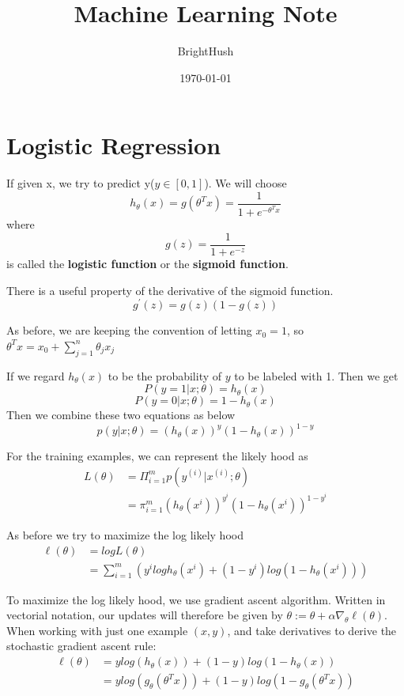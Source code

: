 \documentclass[UTF8]{ctexart}
\title{Machine Learning Note}
\author{BrightHush}
\date{\today}
\begin{document}
\maketitle
\tableofcontents

\pagestyle{fancy}
\cfoot{\thepage}

\newcommand{\figref}[1]{\figurename~\ref{#1}}

\section{Logistic Regression}
If given x, we try to predict y($y \in [0, 1]$). We will choose
\[ h_{\theta}(x) = g(\theta ^ T x) = \frac{1}{1+e^{-\theta ^ T x}} \]
where
\[ g(z) = \frac{1}{1 + e^{-z}} \]
is called the \textbf{logistic function} or the \textbf{sigmoid function}.
\par
There is a useful property of the derivative of the sigmoid function.
\[ g^{'}(z) = g(z)(1-g(z)) \]

\par
As before, we are keeping the convention of letting $x_0 = 1$, so 
$\theta ^ T x = x_0 + \sum_{j=1}^n \theta_j x_j$

If we regard $h_{\theta}(x)$ to be the probability of $y$ to be labeled with
1. Then we get 
\[ P(y=1|x;\theta) = h_{\theta}(x) \]
\[ P(y=0|x;\theta) = 1 - h_{\theta}(x) \]
Then we combine these two equations as below
\[ p(y|x;\theta) = (h_{\theta}(x))^y (1-h_{\theta}(x))^{1-y} \]

\par
For the training examples, we can represent the likely hood as 
\begin{align}
L(\theta) &= \Pi_{i=1}^m p(y^{(i)}|x^{(i)};\theta)
\\
&= \pi_{i=1}^m (h_{\theta}(x^i))^{y^i} (1-h_{\theta}(x^i))^{1-y^i}
\end{align}

\par
As before we try to maximize the log likely hood
\begin{align}
\ell(\theta) &= log L(\theta)
\\
&= \sum_{i=1}^m (y^ilog h_{\theta}(x^i) + (1-y^i)log(1-h_{\theta}(x^i)))
\end{align}

\par
To maximize the log likely hood, we use gradient ascent algorithm. Written
in vectorial notation, our updates will therefore be given by 
$\theta := \theta + \alpha \nabla_{\theta}\ell(\theta)$. When working with just
one example $(x, y)$, and take derivatives to derive the stochastic gradient ascent
rule:
\begin{align}
\ell(\theta) &= ylog(h_{\theta}(x)) + (1-y)log(1-h_{\theta}(x))
\\
&= ylog(g_{\theta}(\theta^T x)) + (1-y)log(1-g_{\theta}(\theta^T x))
\end{align}
\end{document}
